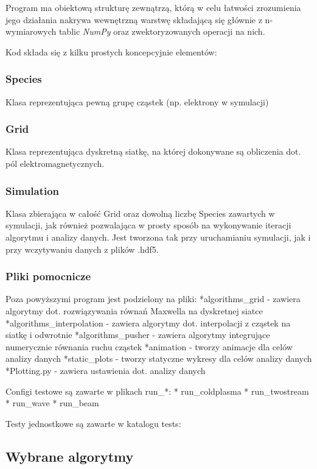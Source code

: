Program ma obiektową strukturę zewnątrzą, którą w celu łatwości zrozumienia jego działania nakrywa wewnętrzną warstwę
składającą się głównie z n-wymiarowych tablic \emph{NumPy} oraz zwektoryzowanych operacji na nich.

Kod składa się z kilku prostych koncepcyjnie elementów:

\subsubsection{Species}
Klasa reprezentująca pewną grupę cząstek (np. elektrony w symulacji)

\subsubsection{Grid}
Klasa reprezentująca dyskretną siatkę, na której dokonywane są obliczenia dot. pól elektromagnetycznych.

\subsubsection{Simulation}
Klasa zbierająca w całość Grid oraz dowolną liczbę Species zawartych w symulacji, jak również
pozwalająca w prosty sposób na wykonywanie iteracji algorytmu i analizy danych. Jest tworzona tak przy
uruchamianiu symulacji, jak i przy wczytywaniu danych z plików .hdf5.

\subsubsection{Pliki pomocnicze}
Poza powyższymi program jest podzielony na pliki:
*algorithms_grid - zawiera algorytmy dot. rozwiązywania równań Maxwella na dyskretnej siatce
*algorithms_interpolation - zawiera algorytmy dot. interpolacji z cząstek na siatkę i odwrotnie
*algorithms_pusher - zawiera algorytmy integrujące numerycznie równania ruchu cząstek
*animation - tworzy animacje dla celów analizy danych
*static_plots - tworzy statyczne wykresy dla celów analizy danych
*Plotting.py - zawiera ustawienia dot. analizy danych %

Configi testowe są zawarte w plikach run_*: %
* run_coldplasma
* run_twostream
* run_wave
* run_beam

Testy jednostkowe są zawarte w katalogu tests:

\subsection{Wybrane algorytmy}

